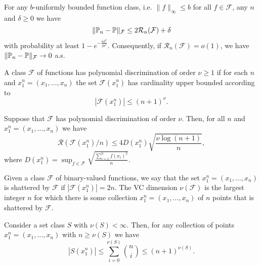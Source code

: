 \begin{boxtheorem}[]
    For any $b$-uniformly bounded function class,
    i.e. $\|f\|_\infty\leq b$ for all $f\in\mathcal{F}$, 
    any $n$ and $\delta\geq0$ we have 
    $$
    \|\P_n-\P\|_\mathcal{F}\leq 
    2\mathcal{R}_n(\mathcal{F}) + \delta$$
    with probability at least 
    $1-e^{-\frac{n\delta^2}{2b^2}}.$ Consequently, if
    $\mathcal{R}_n(\mathcal{F})=o(1)$, we have 
    $\|\P_n-\P\|_\mathcal{F}\to0$ a.s.
\end{boxtheorem}

\begin{boxdefinition}
    A class $\mathcal{F}$ of functions has polynomial
    discrimination of order $\nu\geq1$ if for each
    $n$ and $x_1^n=(x_1,\dots,x_n)$ the set 
    $\mathcal{F}(x_1^n)$ has cardinality upper bounded 
    according to 
    $$
    |\mathcal{F}(x_1^n)|\leq (n+1)^\nu.
    $$
\end{boxdefinition}

\begin{boxtheorem}[]
    Suppose that $\mathcal{F}$ has polynomial discrimination
    of order $\nu$. Then, for all $n$ and 
    $x_1^n=(x_1,\dots,x_n)$ we have 
    $$
    \mathcal{R}(\mathcal{F}(x_1^n)/n)
    \leq 4D(x_1^n)\sqrt{\frac{\nu\log(n+1)}{n}},
    $$
    where $D(x_1^n)=\sup_{f\in\mathcal{F}}
    \sqrt{\frac{\sum_{i=1}^nf(x_i)^2}{n}}$.
\end{boxtheorem}

\begin{boxdefinition}[VC Dimension]
    Given a class $\mathcal{F}$
     of binary-valued functions, we
    say that the set
    $x^n_1 = (x_1 , \dots, x_n )$
     is shattered by $\mathcal{F}$
      if $|\mathcal{F}(x^n_1 )| = 2n$.
    The VC dimension $\nu(\mathcal{F})$
    is the largest integer $n$ for which there 
    is some collection $x^n_1 = (x_1 , \dots , x_n )$
     of $n$ points that is shattered by $\mathcal{F}$.
\end{boxdefinition}

\begin{boxtheorem}
    Consider a set class $S$ with $\nu(S) < \infty.$
    Then, for any collection of points 
    $x_1^n = (x_1 , \dots , x_n )$ with $n\geq\nu(S)$
    we have 
    $$
    |S(x_1^n)|\leq\sum_{i=0}^{\nu(S)}\binom{n}{i}
    \leq (n+1)^{\nu(S)}.$$

\end{boxtheorem}